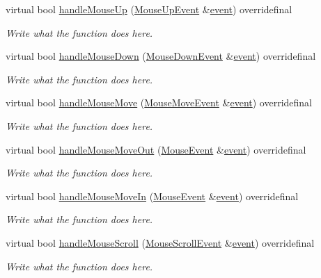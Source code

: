 \begin{DoxyCompactItemize}
virtual bool \hyperlink{classGUIContainer_acba4796c4bec859c70f04a4f4471b3fe}{handle\+Mouse\+Up} (\hyperlink{structMouseUpEvent}{Mouse\+Up\+Event} \&\hyperlink{unionSDL__Event}{event}) overridefinal
\begin{DoxyCompactList}\small\item\em Write what the function does here. \end{DoxyCompactList}\item 
virtual bool \hyperlink{classGUIContainer_a10229d26c8bdac0e8b1c3b0e2863331a}{handle\+Mouse\+Down} (\hyperlink{structMouseDownEvent}{Mouse\+Down\+Event} \&\hyperlink{unionSDL__Event}{event}) overridefinal
\begin{DoxyCompactList}\small\item\em Write what the function does here. \end{DoxyCompactList}\item 
virtual bool \hyperlink{classGUIContainer_a9ee4ac638a114d858ab8836fb3dde441}{handle\+Mouse\+Move} (\hyperlink{structMouseMoveEvent}{Mouse\+Move\+Event} \&\hyperlink{unionSDL__Event}{event}) overridefinal
\begin{DoxyCompactList}\small\item\em Write what the function does here. \end{DoxyCompactList}\item 
virtual bool \hyperlink{classGUIContainer_a85ef65ef4de74236bb2b5f200636fa0c}{handle\+Mouse\+Move\+Out} (\hyperlink{classMouseEvent}{Mouse\+Event} \&\hyperlink{unionSDL__Event}{event}) overridefinal
\begin{DoxyCompactList}\small\item\em Write what the function does here. \end{DoxyCompactList}\item 
virtual bool \hyperlink{classGUIContainer_a5de801e62c8d14d559e3dfae68cca72d}{handle\+Mouse\+Move\+In} (\hyperlink{classMouseEvent}{Mouse\+Event} \&\hyperlink{unionSDL__Event}{event}) overridefinal
\begin{DoxyCompactList}\small\item\em Write what the function does here. \end{DoxyCompactList}\item 
virtual bool \hyperlink{classGUIContainer_a80a3c99fbdec76ac9a333a6737e9ff5a}{handle\+Mouse\+Scroll} (\hyperlink{structMouseScrollEvent}{Mouse\+Scroll\+Event} \&\hyperlink{unionSDL__Event}{event}) overridefinal
\begin{DoxyCompactList}\small\item\em Write what the function does here. \end{DoxyCompactList}\item 

\end{DoxyCompactItemize}
